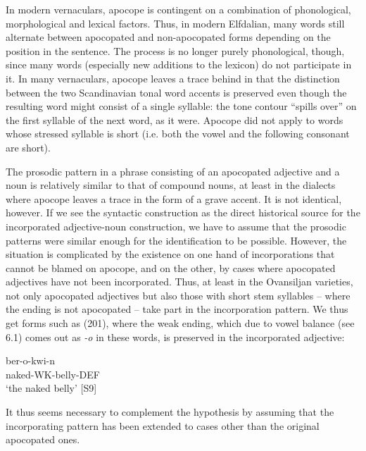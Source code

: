 In modern vernaculars, apocope is contingent on a combination of phonological, morphological and lexical factors. Thus, in modern Elfdalian, many words still alternate between apocopated and non-apocopated forms depending on the position in the sentence. The process is no longer purely phonological, though, since many words (especially new additions to the lexicon) do not participate in it. In many vernaculars, apocope leaves a trace behind in that the distinction between the two Scandinavian tonal word accents is preserved even though the resulting word might consist of a single syllable: the tone contour “spills over” on the first syllable of the next word, as it were. Apocope did not apply to words whose stressed syllable is short (i.e. both the vowel and the following consonant are short).


The prosodic pattern in a phrase consisting of an apocopated adjective and a noun is relatively similar to that of compound nouns, at least in the dialects where apocope leaves a trace in the form of a grave accent. It is not identical, however. If we see the syntactic construction as the direct historical source for the incorporated adjective-noun construction, we have to assume that the prosodic patterns were similar enough for the identification to be possible. However, the situation is complicated by the existence on one hand of incorporations that cannot be blamed on apocope, and on the other, by cases where apocopated adjectives have not been incorporated. Thus, at least in the Ovansiljan varieties, not only apocopated adjectives but also those with short stem syllables – where the ending is not apocopated – take part in the incorporation pattern. We thus get forms such as (201), where the weak ending, which due to vowel balance (see 6.1) comes out as\textit{ {}-o} in these words, is preserved in the incorporated adjective:


\ea\label{}
\gll ber-o-kwi-n\\
naked-WK-belly-DEF\\
\glt ‘the naked belly’ [S9]
\z

It thus seems necessary to complement the hypothesis by assuming that the incorporating pattern has been extended to cases other than the original apocopated ones.

